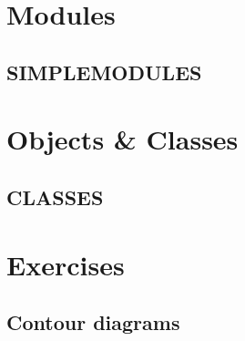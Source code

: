 \documentclass[11pt,a4paper]{book}
\begin{document}
\chapter{Modules}

\section{SIMPLEMODULES}


\chapter{Objects \& Classes}

\section{CLASSES}


\backmatter
\appendix

\chapter{Exercises}

\section{Contour diagrams}



\nocite{*}
\printbibliography
\end{document}

